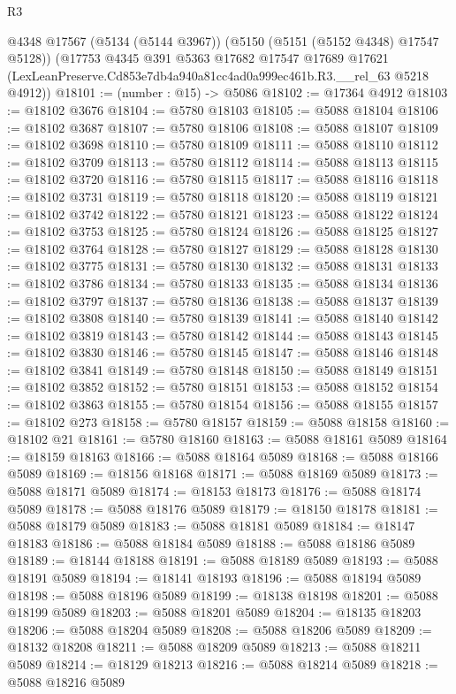 \begin{lexlean}{R3}
\begin{coremodule}
    @4348
    @17567
    (@5134 (@5144 @3967))
    (@5150 (@5151 (@5152 @4348) @17547 @5128))
    (@17753
      @4345
      @391
      @5363
      @17682
      @17547
      @17689
      @17621
      (LexLeanPreserve.Cd853e7db4a940a81cc4ad0a999ec461b.R3.__rel_63 @5218 @4912))
@18101 := (number : @15) -> @5086
@18102 := @17364 @4912
@18103 := @18102 @3676
@18104 := @5780 @18103
@18105 := @5088 @18104
@18106 := @18102 @3687
@18107 := @5780 @18106
@18108 := @5088 @18107
@18109 := @18102 @3698
@18110 := @5780 @18109
@18111 := @5088 @18110
@18112 := @18102 @3709
@18113 := @5780 @18112
@18114 := @5088 @18113
@18115 := @18102 @3720
@18116 := @5780 @18115
@18117 := @5088 @18116
@18118 := @18102 @3731
@18119 := @5780 @18118
@18120 := @5088 @18119
@18121 := @18102 @3742
@18122 := @5780 @18121
@18123 := @5088 @18122
@18124 := @18102 @3753
@18125 := @5780 @18124
@18126 := @5088 @18125
@18127 := @18102 @3764
@18128 := @5780 @18127
@18129 := @5088 @18128
@18130 := @18102 @3775
@18131 := @5780 @18130
@18132 := @5088 @18131
@18133 := @18102 @3786
@18134 := @5780 @18133
@18135 := @5088 @18134
@18136 := @18102 @3797
@18137 := @5780 @18136
@18138 := @5088 @18137
@18139 := @18102 @3808
@18140 := @5780 @18139
@18141 := @5088 @18140
@18142 := @18102 @3819
@18143 := @5780 @18142
@18144 := @5088 @18143
@18145 := @18102 @3830
@18146 := @5780 @18145
@18147 := @5088 @18146
@18148 := @18102 @3841
@18149 := @5780 @18148
@18150 := @5088 @18149
@18151 := @18102 @3852
@18152 := @5780 @18151
@18153 := @5088 @18152
@18154 := @18102 @3863
@18155 := @5780 @18154
@18156 := @5088 @18155
@18157 := @18102 @273
@18158 := @5780 @18157
@18159 := @5088 @18158
@18160 := @18102 @21
@18161 := @5780 @18160
@18163 := @5088 @18161 @5089
@18164 := @18159 @18163
@18166 := @5088 @18164 @5089
@18168 := @5088 @18166 @5089
@18169 := @18156 @18168
@18171 := @5088 @18169 @5089
@18173 := @5088 @18171 @5089
@18174 := @18153 @18173
@18176 := @5088 @18174 @5089
@18178 := @5088 @18176 @5089
@18179 := @18150 @18178
@18181 := @5088 @18179 @5089
@18183 := @5088 @18181 @5089
@18184 := @18147 @18183
@18186 := @5088 @18184 @5089
@18188 := @5088 @18186 @5089
@18189 := @18144 @18188
@18191 := @5088 @18189 @5089
@18193 := @5088 @18191 @5089
@18194 := @18141 @18193
@18196 := @5088 @18194 @5089
@18198 := @5088 @18196 @5089
@18199 := @18138 @18198
@18201 := @5088 @18199 @5089
@18203 := @5088 @18201 @5089
@18204 := @18135 @18203
@18206 := @5088 @18204 @5089
@18208 := @5088 @18206 @5089
@18209 := @18132 @18208
@18211 := @5088 @18209 @5089
@18213 := @5088 @18211 @5089
@18214 := @18129 @18213
@18216 := @5088 @18214 @5089
@18218 := @5088 @18216 @5089

\end{coremodule}
\end{lexlean}
